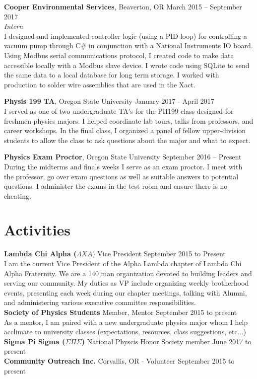 \documentclass[margin,line, 11pt]{res}
\begin{document}
\begin{resume}
{\bf Cooper Environmental Services}, Beaverton, OR \hfill{March 2015 -- September 2017}\\
{\em Intern} \\
I designed and implemented controller logic (using a PID loop) for controlling a vacuum pump through C\# in conjunction with a National Instruments IO board. Using Modbus serial communications protocol, I created code to make data accessible locally with a Modbus slave device. I wrote code using SQLite to send the same data to a local database for long term storage. I worked with production to solder wire assemblies that are used in the Xact. 

{\bf Physis 199 TA}, Oregon State University \hfill{January 2017 - April 2017} \\
I served as one of two undergraduate TA's for the PH199 class designed for freshmen physics majors. I helped coordinate lab tours, talks from professors, and career workshops. In the final class, I organized a panel of fellow upper-division students to allow the class to ask questions about the major and what to expect. 


{\bf Physics Exam Proctor}, Oregon State University \hfill{September 2016 -- Present}\\
During the midterms and finals weeks I serve as an exam proctor. I meet with the professor, go over exam questions as well as suitable answers to potential questions. I administer the exams in the test room and ensure there is no cheating. 

\section{\sc Activities} 
	{\bf Lambda Chi Alpha ($\Lambda XA)$} Vice President \hfill September 2015 to Present\\
	I am the current Vice President of the Alpha Lambda chapter of Lambda Chi Alpha Fraternity. We are a 140 man organization devoted to building leaders and serving our community. My duties as VP include organizing weekly brotherhood events, presenting each week during our chapter meetings, talking with Alumni, and administering various executive committee responsibilities. \\	
	{\bf Society of Physics Students} Member, Mentor \hfill September 2015 to present\\ 
	As a mentor, I am paired with a new undergraduate physics major whom I help acclimate to university classes (expectations, resources, class suggestions, etc...) \\	
	{\bf Sigma Pi Sigma ($\Sigma \Pi \Sigma$)} National Physcis Honor Society member \hfill June 2017 to present \\	
	{\bf Community Outreach Inc.} Corvallis, OR - Volunteer \hfill September 2015 to present\\



\end{resume}
\end{document}
